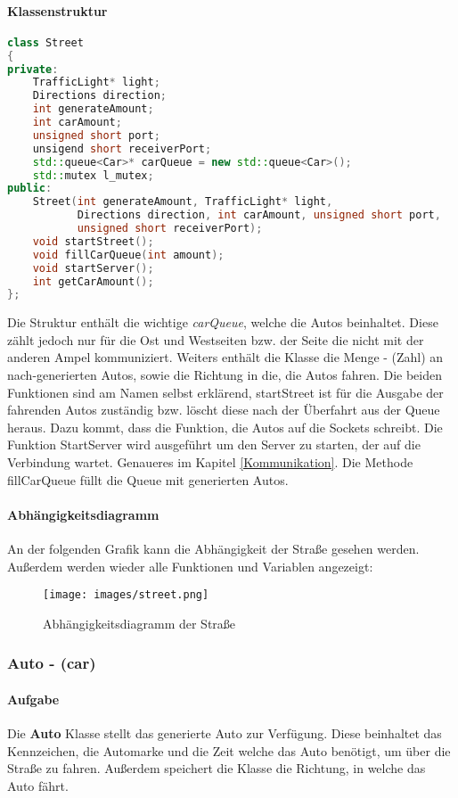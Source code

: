 \documentclass[12pt, oneside]{article}
\begin{document}
\paragraph{Klassenstruktur}
\begin{lstlisting}[language=C++, caption={C++ street.h - Klassenstruktur}]
class Street
{
private:
    TrafficLight* light;
    Directions direction;
    int generateAmount;
    int carAmount;
    unsigned short port;
    unsigend short receiverPort;
    std::queue<Car>* carQueue = new std::queue<Car>();
    std::mutex l_mutex;
public:
    Street(int generateAmount, TrafficLight* light,
           Directions direction, int carAmount, unsigned short port,
           unsigned short receiverPort);
    void startStreet();
    void fillCarQueue(int amount);
    void startServer();
    int getCarAmount();
};
\end{lstlisting}
\noindent Die Struktur enthält die wichtige \emph{carQueue}, welche die Autos beinhaltet. Diese zählt jedoch nur für die Ost und Westseiten  bzw. der Seite die nicht mit der anderen Ampel kommuniziert. Weiters enthält die Klasse die Menge - (Zahl) an nach-generierten Autos, sowie die Richtung in die, die Autos fahren. Die beiden Funktionen sind am Namen selbst erklärend, startStreet ist für die Ausgabe der fahrenden Autos zuständig bzw. löscht diese nach der Überfahrt aus der Queue heraus. Dazu kommt, dass die Funktion, die Autos auf die Sockets schreibt. Die Funktion StartServer wird ausgeführt um den Server zu starten, der auf die Verbindung wartet. Genaueres im Kapitel \ref{Kommunikation}. Die Methode fillCarQueue füllt die Queue mit generierten Autos.

\paragraph{Abhängigkeitsdiagramm} 
An der folgenden Grafik kann die Abhängigkeit der Straße gesehen werden. Außerdem werden wieder alle Funktionen und Variablen angezeigt:

\begin{figure}[H]
    \centering
    \texttt{[image: images/street.png]} 
    \caption{Abhängigkeitsdiagramm der Straße}
    \label{fig:street}
\end{figure}

\subsubsection{Auto - (car)}
\label{car}
\paragraph{Aufgabe}
Die \textbf{Auto} Klasse stellt das generierte Auto zur Verfügung. Diese beinhaltet das Kennzeichen, die Automarke und die Zeit welche das Auto benötigt, um über die Straße zu fahren. Außerdem speichert die Klasse die Richtung, in welche das Auto fährt.  
\end{document}
